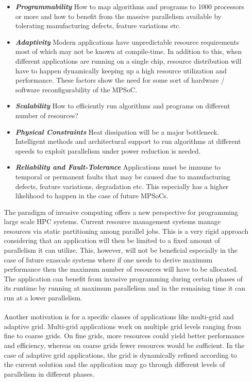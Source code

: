 \begin{itemize}
\item \textbf{\textit{Programmability}} How to map algorithms and programs to 1000 processors or more and how to benefit from the massive parallelism available by tolerating manufacturing defects, feature variations etc.
\item \textbf{\textit{Adaptivity}} Modern applications have unpredictable resource requirements most of which may not be known at compile-time. In addition to this, when different applications are running on a single chip, resource distribution will have to happen dynamically keeping up a high resource utilization and performance. These factors show the need for some sort of hardware / software reconfigurability of the MPSoC.
\item \textbf{\textit{Scalability}} How to efficiently run algorithms and programs on different number of resources?
\item \textbf{\textit{Physical Constraints}} Heat dissipation will be a major bottleneck. Intelligent methods and architectural support to run algorithms at different speeds to exploit parallelism under power reduction is needed.
\item \textbf{\textit{Reliability and Fault-Tolerance}} Applications must be immune to temporal or permanent faults that may be caused due to manufacturing defects, feature variations, degradation etc. This especially has a higher likelihood to happen in the case of future MPSoCs.
\end{itemize}
The paradigm of invasive computing offers a new perspective for programming large scale HPC systems. Current resource management systems manage resources via static partitioning among parallel jobs. This is a very rigid approach considering that an application will then be limited to a fixed amount of parallelism it can utilize. This, however, will not be beneficial especially in the case of future exascale systems where if one needs to derive maximum performance then the maximum number of resources will have to be allocated. The application can benefit from invasive programming during certain phases of its runtime by running at maximum parallelism and in the remaining time it can run at a lower parallelism.\\ \\
Another motivation is for a specific classes of applications like multi-grid and adaptive grid. Multi-grid applications work on multiple grid levels ranging from fine to coarse grids. On fine grids, more resources could yield better performance and efficiency, whereas on coarse grids fewer resources would be sufficient. In the case of adaptive grid applications, the grid is dynamically refined\cite{pfluger}\cite{bungartz}\cite{schrieber} according to the current solution and the application may go through different levels of parallelism in different phases.\\ \\
